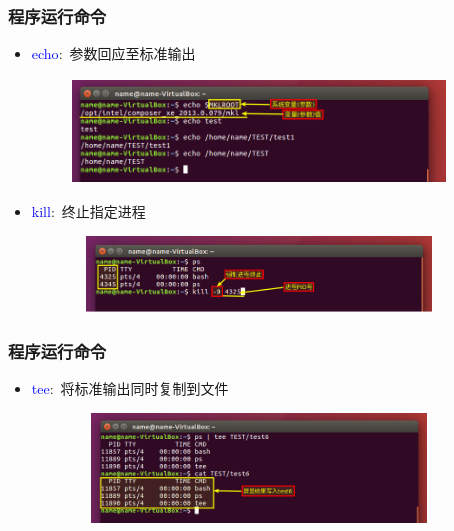 \frame
{
	\frametitle{程序运行命令}
	\begin{itemize}
\setlength{\itemsep}{-10pt}
		\item \textcolor{blue}{echo}:~参数回应至标准输出
\begin{figure}[h!]
\centering
\vspace{-15.5pt}
\includegraphics[height=1.1in,width=3.9in,viewport=0 0 800 230,clip]{Figures/Ubuntu-echo.png}
\label{Linux-command-echo}
\end{figure}
		\item \textcolor{blue}{kill}:~终止指定进程
\begin{figure}[h!]
\centering
\vspace{-15.5pt}
\includegraphics[height=0.8in,width=3.9in,viewport=0 0 800 180,clip]{Figures/Ubuntu-kill.png}
\label{Linux-command-kill}
\end{figure}
\end{itemize}
}

\frame
{
	\frametitle{程序运行命令}
	\begin{itemize}
		\item \textcolor{blue}{tee}:~将标准输出同时复制到文件
\begin{figure}[h!]
\centering
\vspace{-10.5pt}
\includegraphics[height=1.15in,width=3.9in,viewport=0 0 800 260,clip]{Figures/Ubuntu-tee.png}
\label{Linux-command-tee}
\end{figure}
	\end{itemize}
}

